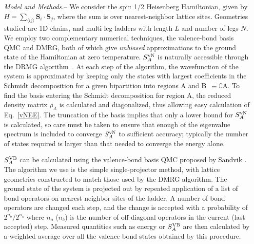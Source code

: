 \documentclass[prl,aps,twocolumn,floatfix,amsmath,amssymb,superscriptaddress,tightenlines]{revtex4}
\begin{document}
{\it Model and Methods.}-- We consider the spin 1/2 Heisenberg
Hamiltonian, given by  $H =  \sum_{\langle i j \rangle} {\mathbf S}_i
\cdot {\mathbf S}_j \label{ham}$, where the sum is over nearest-neighbor lattice
sites.  Geometries studied are 1D chains, and multi-leg ladders with
length $L$ and number of legs $N$.  
We employ two complementary numerical techniques, the valence-bond basis QMC and DMRG, both of
which give {\it unbiased} approximations to the ground state of the
Hamiltonian at zero temperature.  $S^{ \rm vN}_A$ is naturally accessible
through the DRMG 
algorithm~\cite{White92}.  At each
step of the algorithm, the wavefunction of the system is approximated by
keeping only the states with largest coefficients in the Schmidt
decomposition for a given bipartition into regions A and
B~$\equiv\complement$A. To find the
basis entering the Schmidt decomposition for region A, the reduced
density matrix $\rho_A$ is calculated and diagonalized, thus allowing easy
calculation of Eq.~\eqref{vNEE}. The truncation of the basis implies that
only a lower bound for $S^{\rm vN}_A$ is calculated, so care must be taken
to ensure that enough of the eigenvalue spectrum is included to converge
$S^{ \rm vN}_A$ to sufficient accuracy; typically the number of states required
is larger than that needed to converge the energy alone.

$S^{\rm VB}_A$ \cite{Alet,Chh} can be calculated using the valence-bond basis
QMC proposed by Sandvik \cite{Sandvik}.  The 
algorithm we use is the simple single-projector method, with lattice
geometries constructed to match those used by the DMRG algorithm.  The
ground state of the system is projected out by repeated application of a
list of bond operators on nearest neighbor sites of the ladder.  A number
of bond operators are changed each step, and the change is accepted
with a probability of $2^{n_{b}}/2^{n_{a}} $ where $n_{a}$ ($n_{b}$)
is the number of off-diagonal operators in the current (last accepted) step.
Measured quantities such as energy or $S^{\rm VB}_A$ are then calculated 
by a weighted average over all the valence bond
states obtained by this procedure.
\end{document}
